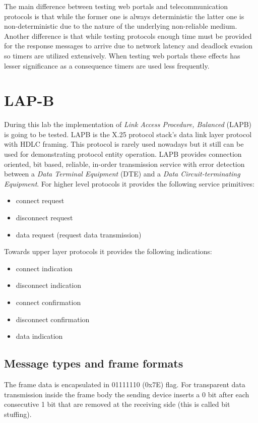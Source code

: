 \documentclass[a4paper]{article}
\begin{document}
The main difference between testing web portals and telecommunication protocols is that while the former one is always
deterministic the latter one is non-deterministic due to the nature of the underlying non-reliable medium. Another
difference is that while testing protocols enough time must be provided for the response messages to arrive due to
network latency and deadlock evasion so timers are utilized extensively. When testing web portals these effects has
lesser significance as a consequence timers are used less frequently.

\section{LAP-B}

During this lab the implementation of  \emph{Link Access Procedure, Balanced} (LAPB) is going to be tested. LAPB is the
X.25 protocol stack's data link layer protocol with HDLC framing. This protocol is rarely used nowadays but it still
can be used for demonstrating protocol entity operation. LAPB provides connection oriented, bit based, reliable,
in-order transmission service with error detection between a \emph{Data Terminal Equipment} (DTE) and a \emph{Data
    Circuit-terminating Equipment}. For higher level protocols it provides the following service primitives:
\begin{itemize}
    \item connect request
    \item disconnect request
    \item data request (request data transmission)
\end{itemize}
Towards upper layer protocols it provides the following indications:
\begin{itemize}
    \item connect indication
    \item disconnect indication
    \item connect confirmation
    \item disconnect confirmation
    \item data indication
\end{itemize}

\subsection{Message types and frame formats}

The frame data is encapsulated in 01111110 (0x7E) flag. For transparent data transmission inside the frame body the
sending device inserts a 0 bit after each consecutive 1 bit that are removed at the receiving side (this is called bit
stuffing).
\end{document}
